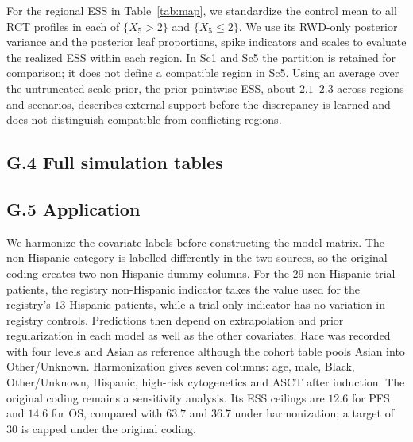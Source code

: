

For the regional ESS in Table~\ref{tab:map}, we standardize the control mean to all RCT profiles in each of $\{X_5>2\}$ and $\{X_5\le2\}$. We use its RWD-only posterior variance and the posterior leaf proportions, spike indicators and scales to evaluate the realized ESS within each region. In Sc1 and Sc5 the partition is retained for comparison; it does not define a compatible region in Sc5. Using an average over the untruncated scale prior, the prior pointwise ESS, about $2.1$--$2.3$ across regions and scenarios, describes external support before the discrepancy is learned and does not distinguish compatible from conflicting regions.

\subsection*{G.4 Full simulation tables}






\subsection*{G.5 Application}

We harmonize the covariate labels before constructing the model matrix. The non-Hispanic category is labelled differently in the two sources, so the original coding creates two non-Hispanic dummy columns. For the $29$ non-Hispanic trial patients, the registry non-Hispanic indicator takes the value used for the registry's $13$ Hispanic patients, while a trial-only indicator has no variation in registry controls. Predictions then depend on extrapolation and prior regularization in each model as well as the other covariates. Race was recorded with four levels and Asian as reference although the cohort table pools Asian into Other/Unknown. Harmonization gives seven columns: age, male, Black, Other/Unknown, Hispanic, high-risk cytogenetics and ASCT after induction. The original coding remains a sensitivity analysis. Its ESS ceilings are $12.6$ for PFS and $14.6$ for OS, compared with $63.7$ and $36.7$ under harmonization; a target of $30$ is capped under the original coding.


